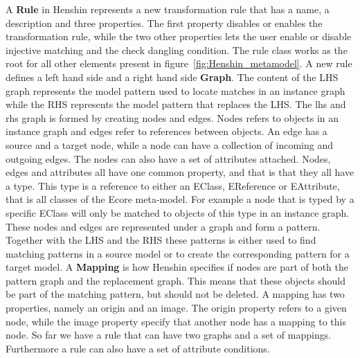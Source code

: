 A \textbf{Rule} in Henshin represents a new transformation rule that has a name,
a description and three properties. The first property disables or enables the
transformation rule, while the two other properties lets the user enable or
disable injective matching and the check dangling condition. The rule class
works as the root for all other elements present in
figure~\ref{fig:Henshin_metamodel}. A new rule defines a left hand side and a
right hand side \textbf{Graph}. The content of the LHS graph represents the
model pattern used to locate matches in an instance graph while the RHS
represents the model pattern that replaces the LHS. The lhs and rhs graph is
formed by creating nodes and edges. Nodes refers to objects in an instance graph
and edges refer to references between objects. An edge has a source and a target
node, while a node can have a collection of incoming and outgoing edges. The
nodes can also have a set of attributes attached. Nodes, edges and attributes
all have one common property, and that is that they all have a type. This type
is a reference to either an EClass, EReference or EAttribute, that is all
classes of the Ecore meta-model. For example a node that is typed by a specific
EClass will only be matched to objects of this type in an instance graph. These
nodes and edges are represented under a graph and form a pattern. Together with
the LHS and the RHS these patterns is either used to find matching patterns in
a source model or to create the corresponding pattern for a target model. A
\textbf{Mapping} is how Henshin specifies if nodes are part of both the pattern
graph and the replacement graph. This means that these objects should be part of
the matching pattern, but should not be deleted. A mapping has two properties,
namely an origin and an image. The origin property refers to a given node, while
the image property specify that another node has a mapping to this node. So far
we have a rule that can have two graphs and a set of mappings. Furthermore a
rule can also have a set of attribute conditions. 

